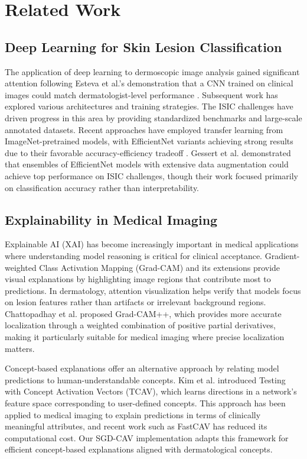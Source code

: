 \section{Related Work}

\subsection{Deep Learning for Skin Lesion Classification}

The application of deep learning to dermoscopic image analysis gained
significant attention following Esteva et al.'s demonstration that a CNN
trained on clinical images could match dermatologist-level performance
\cite{esteva2017dermatologist}. Subsequent work has explored various
architectures and training strategies. The ISIC challenges have driven
progress in this area by providing standardized benchmarks and large-scale
annotated datasets. Recent approaches have employed transfer learning from
ImageNet-pretrained models, with EfficientNet variants achieving strong
results due to their favorable accuracy-efficiency tradeoff
\cite{tan2019efficientnet}. Gessert et al. \cite{gessert2020skin} demonstrated
that ensembles of EfficientNet models with extensive data augmentation could
achieve top performance on ISIC challenges, though their work focused
primarily on classification accuracy rather than interpretability.

\subsection{Explainability in Medical Imaging}

Explainable AI (XAI) has become increasingly important in medical applications
where understanding model reasoning is critical for clinical acceptance.
Gradient-weighted Class Activation Mapping (Grad-CAM) \cite{selvaraju2017grad}
and its extensions provide visual explanations by highlighting image regions
that contribute most to predictions. In dermatology, attention visualization
helps verify that models focus on lesion features rather than artifacts or
irrelevant background regions. Chattopadhay et al. \cite{chattopadhay2018grad}
proposed Grad-CAM++, which provides more accurate localization through a
weighted combination of positive partial derivatives, making it particularly
suitable for medical imaging where precise localization matters.

Concept-based explanations offer an alternative approach by relating model
predictions to human-understandable concepts. Kim et al.
\cite{kim2018interpretability} introduced Testing with Concept Activation
Vectors (TCAV), which learns directions in a network's feature space
corresponding to user-defined concepts. This approach has been applied to
medical imaging to explain predictions in terms of clinically meaningful
attributes, and recent work such as FastCAV \cite{schmalwasser2025fastcav} has
reduced its computational cost. Our SGD-CAV implementation adapts this framework
for efficient concept-based explanations aligned with dermatological concepts.

